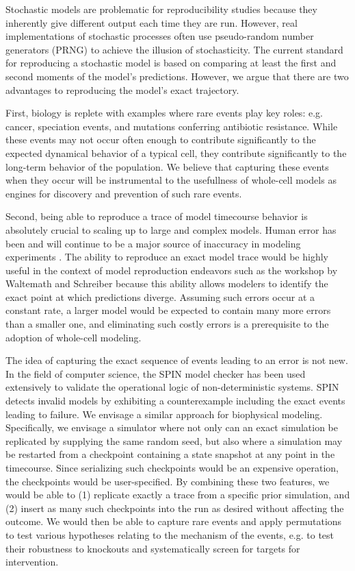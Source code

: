 \documentclass[journal,transmag,twoside]{IEEEtran}
\begin{document}
Stochastic models are problematic for reproducibility studies because they inherently give different output each time they are run. However, real implementations of stochastic processes often use pseudo-random number generators (PRNG) to achieve the illusion of stochasticity. The current standard for reproducing a stochastic model is based on comparing at least the first and second moments of the model's predictions. However, we argue that there are two advantages to reproducing the model's exact trajectory.

First, biology is replete with examples where rare events play key roles: e.g. cancer, speciation events, and mutations conferring antibiotic resistance. While these events may not occur often enough to contribute significantly to the expected dynamical behavior of a typical cell, they contribute significantly to the long-term behavior of the population. We believe that capturing these events when they occur will be instrumental to the usefullness of whole-cell models as engines for discovery and prevention of such rare events.

Second, being able to reproduce a trace of model timecourse behavior is absolutely crucial to scaling up to large and complex models. Human error has been and will continue to be a major source of inaccuracy in modeling experiments \cite{ebrahim2015genome}. The ability to reproduce an exact model trace would be highly useful in the context of model reproduction endeavors such as the workshop by Waltemath and Schreiber because this ability allows modelers to identify the exact point at which predictions diverge. Assuming such errors occur at a constant rate, a larger model would be expected to contain many more errors than a smaller one, and eliminating such costly errors is a prerequisite to the adoption of whole-cell modeling.

The idea of capturing the exact sequence of events leading to an error is not new. In the field of computer science, the SPIN model checker \cite{holzmann1997model} \cite{holzmann2004spin} has been used extensively to validate the operational logic of non-deterministic systems. SPIN detects invalid models by exhibiting a counterexample including the exact events leading to failure. We envisage a similar approach for biophysical modeling. Specifically, we envisage a simulator where not only can an exact simulation be replicated by supplying the same random seed, but also where a simulation may be restarted from a checkpoint containing a state snapshot at any point in the timecourse. Since serializing such checkpoints would be an expensive operation, the checkpoints would be user-specified. By combining these two features, we would be able to (1) replicate exactly a trace from a specific prior simulation, and (2) insert as many such checkpoints into the run as desired without affecting the outcome. We would then be able to capture rare events and apply permutations to test various hypotheses relating to the mechanism of the events, e.g. to test their robustness to knockouts and systematically screen for targets for intervention.
\end{document}
